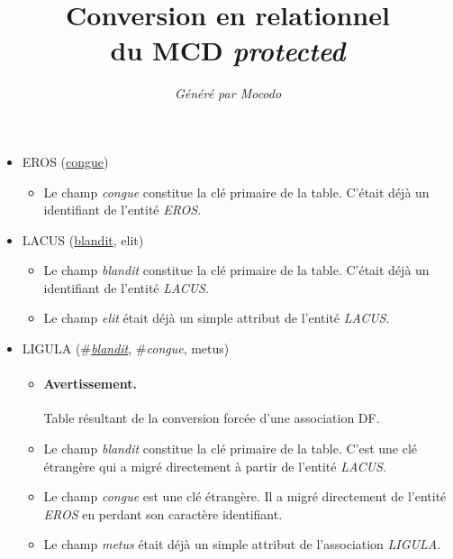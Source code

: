 \documentclass[a4paper]{article}
\title{Conversion en relationnel\\du MCD \emph{protected}}
\author{\emph{Généré par Mocodo}}
\newcommand{\relat}[1]{\textsc{#1}}
\newcommand{\attr}[1]{#1}
\newcommand{\prim}[1]{\uline{#1}}
\newcommand{\foreign}[1]{\#\textsl{#1}}
\begin{document}
\maketitle

\begin{itemize}
  \item \relat{EROS} (\prim{congue})
  \begin{itemize}
    \item Le champ \emph{congue} constitue la clé primaire de la table. C'était déjà un identifiant de l'entité \emph{EROS}.
  \end{itemize}

  \item \relat{LACUS} (\prim{blandit}, \attr{elit})
  \begin{itemize}
    \item Le champ \emph{blandit} constitue la clé primaire de la table. C'était déjà un identifiant de l'entité \emph{LACUS}.
    \item Le champ \emph{elit} était déjà un simple attribut de l'entité \emph{LACUS}.
  \end{itemize}

  \item \relat{LIGULA} (\foreign{\prim{blandit}}, \foreign{congue}, \attr{metus})
  \begin{itemize}
    \item \paragraph{Avertissement.} Table résultant de la conversion forcée d'une association DF.
    \item Le champ \emph{blandit} constitue la clé primaire de la table. C'est une clé étrangère qui a migré directement à partir de l'entité \emph{LACUS}.
    \item Le champ \emph{congue} est une clé étrangère. Il a migré directement de l'entité \emph{EROS} en perdant son caractère identifiant.
    \item Le champ \emph{metus} était déjà un simple attribut de l'association \emph{LIGULA}.
  \end{itemize}

\end{itemize}
\end{document}
